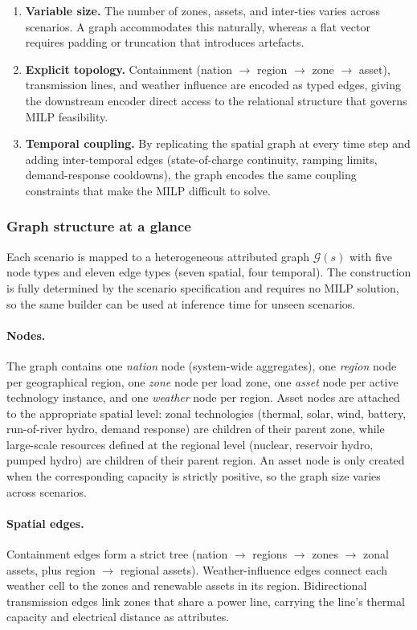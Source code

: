 \documentclass{article}
\begin{document}
\begin{enumerate}[noitemsep]
  \item \textbf{Variable size.} The number of zones, assets, and inter-ties varies across scenarios. A graph accommodates this naturally, whereas a flat vector requires padding or truncation that introduces artefacts.
  \item \textbf{Explicit topology.} Containment (nation $\to$ region $\to$ zone $\to$ asset), transmission lines, and weather influence are encoded as typed edges, giving the downstream encoder direct access to the relational structure that governs MILP feasibility.
  \item \textbf{Temporal coupling.} By replicating the spatial graph at every time step and adding inter-temporal edges (state-of-charge continuity, ramping limits, demand-response cooldowns), the graph encodes the same coupling constraints that make the MILP difficult to solve.
\end{enumerate}

\subsubsection{Graph structure at a glance}

Each scenario is mapped to a heterogeneous attributed graph $\mathcal{G}(s)$ with five node types and eleven edge types (seven spatial, four temporal). The construction is fully determined by the scenario specification and requires no MILP solution, so the same builder can be used at inference time for unseen scenarios.

\paragraph{Nodes.}
The graph contains one \emph{nation} node (system-wide aggregates), one \emph{region} node per geographical region, one \emph{zone} node per load zone, one \emph{asset} node per active technology instance, and one \emph{weather} node per region. Asset nodes are attached to the appropriate spatial level: zonal technologies (thermal, solar, wind, battery, run-of-river hydro, demand response) are children of their parent zone, while large-scale resources defined at the regional level (nuclear, reservoir hydro, pumped hydro) are children of their parent region. An asset node is only created when the corresponding capacity is strictly positive, so the graph size varies across scenarios.

\paragraph{Spatial edges.}
Containment edges form a strict tree (nation $\to$ regions $\to$ zones $\to$ zonal assets, plus region $\to$ regional assets). Weather-influence edges connect each weather cell to the zones and renewable assets in its region. Bidirectional transmission edges link zones that share a power line, carrying the line's thermal capacity and electrical distance as attributes.
\end{document}
